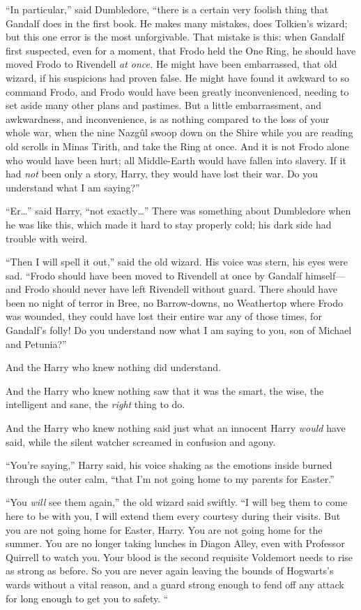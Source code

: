“In particular,” said Dumbledore, “there is a certain very foolish thing that Gandalf does in the first book. He makes many mistakes, does Tolkien’s wizard; but this one error is the most unforgivable. That mistake is this: when Gandalf first suspected, even for a moment, that Frodo held the One Ring, he should have moved Frodo to Rivendell \emph{at once.} He might have been embarrassed, that old wizard, if his suspicions had proven false. He might have found it awkward to so command Frodo, and Frodo would have been greatly inconvenienced, needing to set aside many other plans and pastimes. But a little embarrassment, and awkwardness, and inconvenience, is as nothing compared to the loss of your whole war, when the nine Nazgûl swoop down on the Shire while you are reading old scrolls in Minas Tirith, and take the Ring at once. And it is not Frodo alone who would have been hurt; all Middle-Earth would have fallen into slavery. If it had \emph{not} been only a story, Harry, they would have lost their war. Do you understand what I am saying?”

“Er…” said Harry, “not exactly…” There was something about Dumbledore when he was like this, which made it hard to stay properly cold; his dark side had trouble with weird.

“Then I will spell it out,” said the old wizard. His voice was stern, his eyes were sad. “Frodo should have been moved to Rivendell at once by Gandalf himself—and Frodo should never have left Rivendell without guard. There should have been no night of terror in Bree, no Barrow-downs, no Weathertop where Frodo was wounded, they could have lost their entire war any of those times, for Gandalf’s folly! Do you understand now what I am saying to you, son of Michael and Petunia?”

And the Harry who knew nothing did understand.

And the Harry who knew nothing saw that it was the smart, the wise, the intelligent and sane, the \emph{right} thing to do.

And the Harry who knew nothing said just what an innocent Harry \emph{would} have said, while the silent watcher screamed in confusion and agony.

“You’re saying,” Harry said, his voice shaking as the emotions inside burned through the outer calm, “that I’m not going home to my parents for Easter.”

“You \emph{will} see them again,” the old wizard said swiftly. “I will beg them to come here to be with you, I will extend them every courtesy during their visits. But you are not going home for Easter, Harry. You are not going home for the summer. You are no longer taking lunches in Diagon Alley, even with Professor Quirrell to watch you. Your blood is the second requisite Voldemort needs to rise as strong as before. So you are never again leaving the bounds of Hogwarts’s wards without a vital reason, and a guard strong enough to fend off any attack for long enough to get you to safety. “

